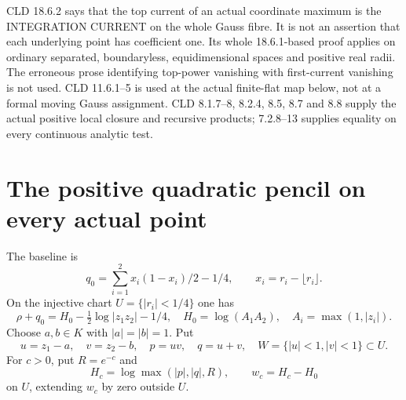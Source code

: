 \documentclass[11pt]{article}
\begin{document}
CLD 18.6.2 says that the top current of an actual coordinate maximum
is the INTEGRATION CURRENT on the whole Gauss fibre. It is not an
assertion that each underlying point has coefficient one. Its whole
18.6.1-based proof applies on ordinary separated, boundaryless,
equidimensional spaces and positive real radii. The erroneous prose
identifying top-power vanishing with first-current vanishing is not
used. CLD 11.6.1--5 is used at the actual finite-flat map below,
not at a formal moving Gauss assignment. CLD 8.1.7--8, 8.2.4,
8.5, 8.7 and 8.8 supply the actual positive local closure and recursive
products; 7.2.8--13 supplies equality on every continuous analytic test.

\section{The positive quadratic pencil on every actual point}
The baseline is
\[
 q_0=\sum_{i=1}^2 x_i(1-x_i)/2-1/4,
 \qquad x_i=r_i-\lfloor r_i\rfloor.
\]
On the injective chart $U=\{|r_i|<1/4\}$ one has
\[
 \rho+q_0=H_0-\tfrac12\log|z_1z_2|-1/4,
 \quad H_0=\log(A_1A_2),\quad A_i=\max(1,|z_i|).
\]
Choose $a,b\in K$ with $|a|=|b|=1$. Put
\[
 u=z_1-a,\quad v=z_2-b,\quad p=uv,\quad q=u+v,
 \quad W=\{|u|<1,|v|<1\}\subset U.
\]
For $c>0$, put $R=e^{-c}$ and
\[
 H_c=\log\max(|p|,|q|,R),\qquad w_c=H_c-H_0
\]
on $U$, extending $w_c$ by zero outside $U$.
\end{document}
